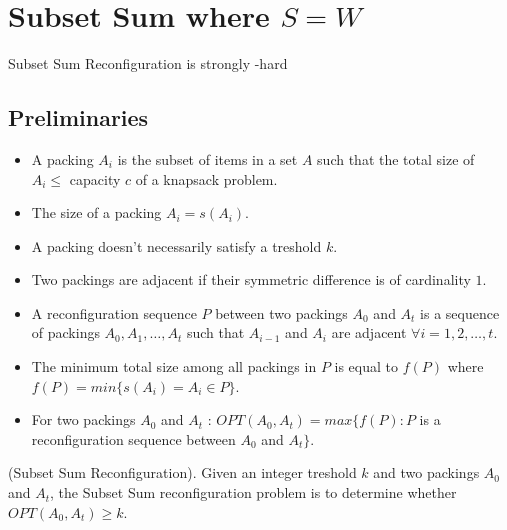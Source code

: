 \section{Subset Sum where $S = W$}
\begin{theorem}{}Subset Sum Reconfiguration is strongly \NP-hard
\end{theorem}

\subsection{Preliminaries}
\begin{itemize}
    \item A packing $A_i$ is the subset of items in a set $A$ such that the total size of $A_i \leq$ capacity $c$ of a knapsack problem.
    \item The size of a packing $A_i = s(A_i)$.
    \item A packing doesn't necessarily satisfy a treshold $k$.
    \item Two packings are adjacent if their symmetric difference is of cardinality $1$.
    \item A reconfiguration sequence $P$ between two packings $A_0$ and $A_t$ is a sequence of packings $A_0, A_1, \dots, A_t$ such that $A_{i-1}$ and $A_i$ are adjacent $\forall i = 1, 2, \dots, t$.
    \item The minimum total size among all packings in $P$ is equal to $f(P)$ where $f(P) = min \{s(A_i) = A_i \in P\}$.
    \item For two packings $A_0$ and $A_t$ : $OPT(A_0, A_t) = max \{ f(P) : P$ is a reconfiguration sequence between $A_0$ and $A_t\}$.
\end{itemize}

\begin{defn}{(Subset Sum Reconfiguration).} Given an integer treshold $k$ and two packings $A_0$ and $A_t$, the Subset Sum reconfiguration problem is to determine whether $OPT(A_0, A_t) \geq k$.
\end{defn}

